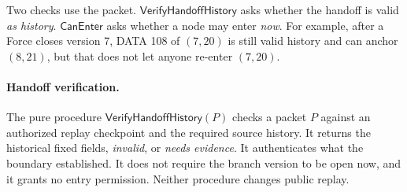 \documentclass[11pt,a4paper]{article}
\newcommand{\tagg}[1]{\ensuremath{\mathsf{#1}}}
\begin{document}
Two checks use the packet. \tagg{VerifyHandoffHistory} asks whether the
handoff is valid \emph{as history}. \tagg{CanEnter} asks whether a node
may enter \emph{now}. For example, after a Force closes version 7, DATA
108 of $(7,20)$ is still valid history and can anchor $(8,21)$, but that
does not let anyone re-enter $(7,20)$.


\paragraph{Handoff verification.}
\label{sec:verify-handoff}
The pure procedure $\tagg{VerifyHandoffHistory}(P)$ checks a packet $P$
against an authorized replay checkpoint and the required source history.
It returns the historical fixed fields, \emph{invalid},
or \emph{needs evidence}. It authenticates what the boundary established.
It does not require the branch version to be open now, and it grants no
entry permission. Neither procedure changes public replay.
\end{document}

